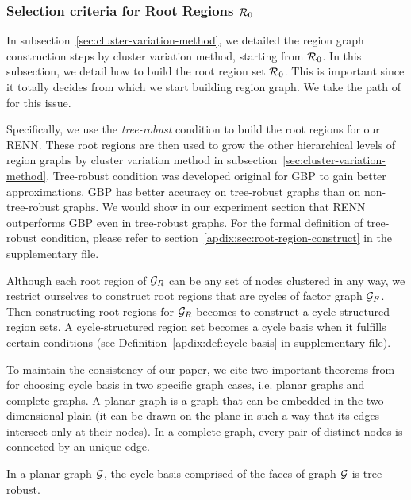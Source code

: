 \subsubsection{Selection criteria for Root Regions $\mathcal{R}_{0}$}
\label{sec:criteria-root-regions}
In subsection~\ref{sec:cluster-variation-method}, we detailed the region graph construction steps by cluster variation method, starting from $\mathcal{R}_0$. In this subsection, we detail how to build the root region set $\mathcal{R}_0$. This is important since it totally decides from which we start building region graph.
We take the path of \cite{welling2005structured, gelfand2012generalized} for this issue.

Specifically, we use the \textit{tree-robust} condition \cite{gelfand2012generalized} to build the root regions for our RENN. These root regions are then used to grow the other hierarchical levels of region graphs by cluster variation method in subsection~\ref{sec:cluster-variation-method}. Tree-robust condition was developed original for GBP to gain better approximations. GBP has better accuracy on tree-robust graphs than on non-tree-robust graphs. We would show in our experiment section that RENN outperforms GBP even in tree-robust graphs. For the formal definition of tree-robust condition, please refer to section~\ref{apdix:sec:root-region-construct} in the supplementary file.

Although each root region of $\mathcal{G}_R$ can be any set of nodes clustered in any way, we restrict ourselves to construct root regions that are cycles of factor graph $\mathcal{G}_F$. Then constructing root regions for $\mathcal{G}_R$ becomes to construct a cycle-structured region sets. A cycle-structured region set becomes a cycle basis when it fulfills certain conditions (see Definition~\ref{apdix:def:cycle-basis} in supplementary file).

To maintain the consistency of our paper, we cite two important theorems from \cite{gelfand2012generalized} for choosing cycle basis in two specific graph cases, i.e. planar graphs and complete graphs. A planar graph is a graph that can be embedded in the two-dimensional plain (it can be drawn on the plane in such a way that its edges intersect only at their nodes). In a complete graph, every pair of distinct nodes is connected by an unique edge.

\begin{theorem}\label{thm:planar-tree-robust}
  In a planar graph $\mathcal{G}$, the cycle basis comprised of the faces of graph $\mathcal{G}$ is tree-robust.
\end{theorem}

